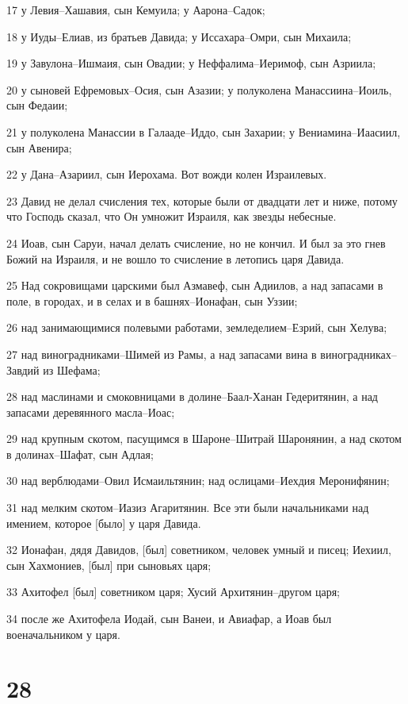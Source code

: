 \par 17 у Левия--Хашавия, сын Кемуила; у Аарона--Садок;
\par 18 у Иуды--Елиав, из братьев Давида; у Иссахара--Омри, сын Михаила;
\par 19 у Завулона--Ишмаия, сын Овадии; у Неффалима--Иеримоф, сын Азриила;
\par 20 у сыновей Ефремовых--Осия, сын Азазии; у полуколена Манассиина--Иоиль, сын Федаии;
\par 21 у полуколена Манассии в Галааде--Иддо, сын Захарии; у Вениамина--Иаасиил, сын Авенира;
\par 22 у Дана--Азариил, сын Иерохама. Вот вожди колен Израилевых.
\par 23 Давид не делал счисления тех, которые были от двадцати лет и ниже, потому что Господь сказал, что Он умножит Израиля, как звезды небесные.
\par 24 Иоав, сын Саруи, начал делать счисление, но не кончил. И был за это гнев Божий на Израиля, и не вошло то счисление в летопись царя Давида.
\par 25 Над сокровищами царскими был Азмавеф, сын Адиилов, а над запасами в поле, в городах, и в селах и в башнях--Ионафан, сын Уззии;
\par 26 над занимающимися полевыми работами, земледелием--Езрий, сын Хелува;
\par 27 над виноградниками--Шимей из Рамы, а над запасами вина в виноградниках--Завдий из Шефама;
\par 28 над маслинами и смоковницами в долине--Баал-Ханан Гедеритянин, а над запасами деревянного масла--Иоас;
\par 29 над крупным скотом, пасущимся в Шароне--Шитрай Шаронянин, а над скотом в долинах--Шафат, сын Адлая;
\par 30 над верблюдами--Овил Исмаильтянин; над ослицами--Иехдия Меронифянин;
\par 31 над мелким скотом--Иазиз Агаритянин. Все эти были начальниками над имением, которое [было] у царя Давида.
\par 32 Ионафан, дядя Давидов, [был] советником, человек умный и писец; Иехиил, сын Хахмониев, [был] при сыновьях царя;
\par 33 Ахитофел [был] советником царя; Хусий Архитянин--другом царя;
\par 34 после же Ахитофела Иодай, сын Ванеи, и Авиафар, а Иоав был военачальником у царя.

\chapter{28}


